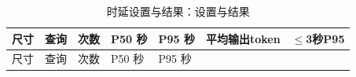 \FloatBarrier\begingroup\small\setlength{\tabcolsep}{2.5pt}
\begin{longtable}[]{@{}
  >{\raggedleft\arraybackslash}p{}
  >{\raggedright\arraybackslash}p{}
  >{\raggedleft\arraybackslash}p{}
  >{\raggedleft\arraybackslash}p{}
  >{\raggedleft\arraybackslash}p{}
  >{\raggedleft\arraybackslash}p{}
  >{\raggedright\arraybackslash}p{}@{}}
\caption{时延设置与结果：设置与结果}\label{tab:s24-1}\tabularnewline
\toprule\noalign{}
\begin{minipage}[b]{\linewidth}\raggedleft
尺寸
\end{minipage} & \begin{minipage}[b]{\linewidth}\raggedright
查询
\end{minipage} & \begin{minipage}[b]{\linewidth}\raggedleft
次数
\end{minipage} & \begin{minipage}[b]{\linewidth}\raggedleft
P50 秒
\end{minipage} & \begin{minipage}[b]{\linewidth}\raggedleft
P95 秒
\end{minipage} & \begin{minipage}[b]{\linewidth}\raggedleft
平均输出token
\end{minipage} & \begin{minipage}[b]{\linewidth}\raggedright
\(\leq\)3秒P95
\end{minipage} \\
\midrule\noalign{}
\endfirsthead
\toprule\noalign{}
\begin{minipage}[b]{\linewidth}\raggedleft
尺寸
\end{minipage} & \begin{minipage}[b]{\linewidth}\raggedright
查询
\end{minipage} & \begin{minipage}[b]{\linewidth}\raggedleft
次数
\end{minipage} & \begin{minipage}[b]{\linewidth}\raggedleft
P50 秒
\end{minipage} & \begin{minipage}[b]{\linewidth}\raggedleft
P95 秒
\end{minipage} & \begin{minipage}[b]{\linewidth}\raggedleft

\end{minipage}
\end{longtable}
